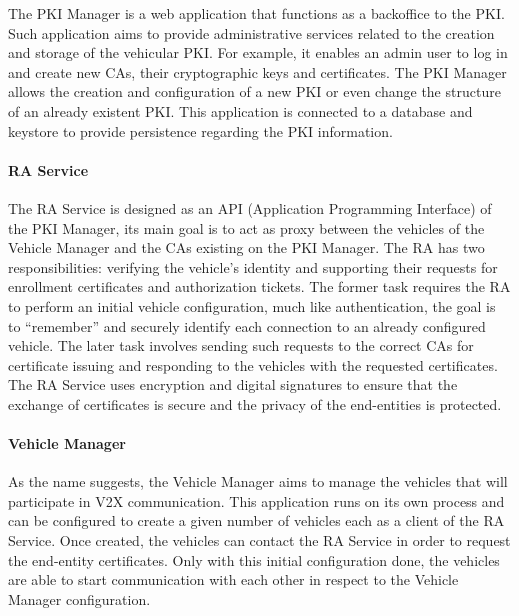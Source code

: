 The PKI Manager is a web application that functions as a backoffice to the PKI. Such application aims to provide administrative services related to the creation and storage of the vehicular PKI. For example, it enables an admin user to log in and create new CAs, their cryptographic keys and certificates. The PKI Manager allows the creation and configuration of a new PKI or even change the structure of an already existent PKI. This application is connected to a database and keystore to provide persistence regarding the PKI information.


\paragraph{RA Service}
\label{section:model}

The RA Service is designed as an API (Application Programming Interface) of the PKI Manager, its main goal is to act as proxy between the vehicles of the Vehicle Manager and the CAs existing on the PKI Manager. The RA has two responsibilities: verifying the vehicle's identity and supporting their requests for enrollment certificates and authorization tickets. The former task requires the RA to perform an initial vehicle configuration, much like authentication, the goal is to “remember” and securely identify each connection to an already configured vehicle. The later task involves sending such requests to the correct CAs for certificate issuing and responding to the vehicles with the requested certificates. The RA Service uses encryption and digital signatures to ensure that the exchange of certificates is secure and the privacy of the end-entities is protected.

\paragraph{Vehicle Manager}
\label{section:model}
As the name suggests, the Vehicle Manager aims to manage the vehicles that will participate in V2X communication. This application runs on its own process and can be configured to create a given number of vehicles each as a client of the RA Service. Once created, the vehicles can contact the RA Service in order to request the end-entity certificates. Only with this initial configuration done, the vehicles are able to start communication with each other in respect to the Vehicle Manager configuration.

